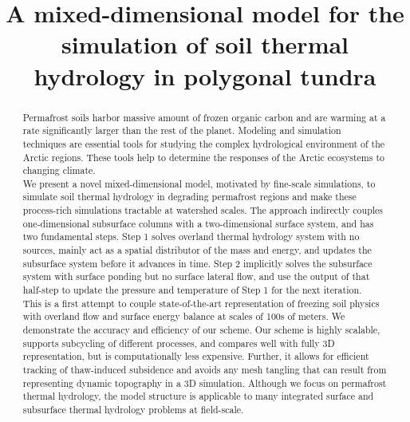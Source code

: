 \documentclass[review]{elsarticle}
\begin{document}
\begin{frontmatter}

\title{A mixed-dimensional model for the simulation of soil thermal hydrology in polygonal tundra}





\begin{abstract}
Permafrost soils harbor massive amount of frozen organic carbon and are warming at a rate significantly larger than the rest of the planet. Modeling and simulation techniques are essential tools for studying the complex hydrological environment of the Arctic regions. These tools help to determine the responses of the Arctic ecosystems to changing climate. \\
We present a novel mixed-dimensional model, motivated by fine-scale simulations, to simulate soil thermal hydrology in degrading permafrost regions and make these process-rich simulations tractable at watershed scales. The approach indirectly couples one-dimensional subsurface columns with a two-dimensional surface system, and has two fundamental steps. Step 1 solves overland thermal hydrology system with no sources, mainly act as a spatial distributor of the mass and energy, and updates the subsurface system before it advances in time. Step 2 implicitly solves the subsurface system with surface ponding but no surface lateral flow, and use the output of that half-step to update the pressure and temperature of Step 1 for the next iteration. \\
This is a first attempt to couple state-of-the-art representation of freezing soil physics with overland flow and surface energy balance at scales of 100s of meters. 
We demonstrate the accuracy and efficiency of our scheme. Our scheme is highly scalable, supports subcycling of different processes, and compares well with fully 3D representation, but is computationally less expensive. Further, it allows for efficient tracking of thaw-induced subsidence and avoids any mesh tangling that can result from representing dynamic topography in a 3D simulation. Although we focus on permafrost thermal hydrology, the model structure is applicable to many integrated surface and subsurface thermal hydrology problems at field-scale.
\end{abstract}


\end{frontmatter}
\end{document}
